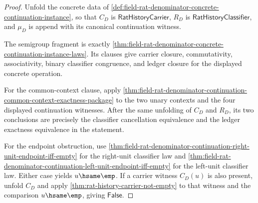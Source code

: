 \begin{proof}
Unfold the concrete data of
\autoref{def:field-rat-denominator-concrete-continuation-instance}, so that
$C_D$ is $\mathsf{RatHistoryCarrier}$, $R_D$ is
$\mathsf{RatHistoryClassifier}$, and $\mu_D$ is append with its canonical
continuation witness.

The semigroup fragment is exactly
\autoref{thm:field-rat-denominator-concrete-continuation-instance-laws}. Its
clauses give carrier closure, commutativity, associativity, binary classifier
congruence, and ledger closure for the displayed concrete operation.

For the common-context clause, apply
\autoref{thm:field-rat-denominator-continuation-common-context-exactness-package}
to the two unary contexts and the four displayed continuation witnesses. After
the same unfolding of $C_D$ and $R_D$, its two conclusions are precisely the
classifier cancellation equivalence and the ledger exactness equivalence in the
statement.

For the endpoint obstruction, use
\autoref{thm:field-rat-denominator-continuation-right-unit-endpoint-iff-empty}
for the right-unit classifier law and
\autoref{thm:field-rat-denominator-continuation-left-unit-endpoint-iff-empty}
for the left-unit classifier law. Either case yields $u\hsame\emp$. If a
carrier witness $C_D(u)$ is also present, unfold $C_D$ and apply
\autoref{thm:rat-history-carrier-not-empty} to that witness and the comparison
$u\hsame\emp$, giving $\mathsf{False}$.
\end{proof}

